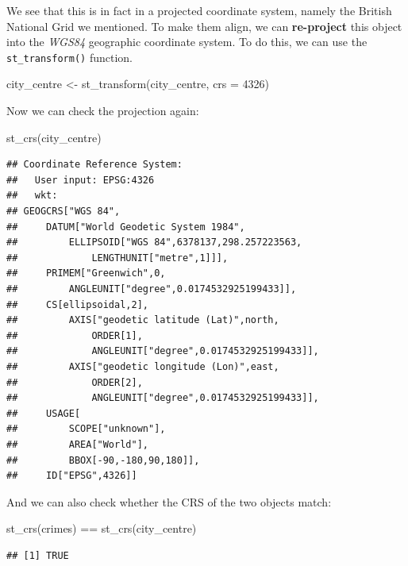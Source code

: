\documentclass[
]{book}
\newenvironment{Shaded}{\begin{snugshade}}{\end{snugshade}}
\newcommand{\AttributeTok}[1]{\textcolor[rgb]{0.77,0.63,0.00}{#1}}
\newcommand{\DecValTok}[1]{\textcolor[rgb]{0.00,0.00,0.81}{#1}}
\newcommand{\FunctionTok}[1]{\textcolor[rgb]{0.00,0.00,0.00}{#1}}
\newcommand{\NormalTok}[1]{#1}
\newcommand{\OtherTok}[1]{\textcolor[rgb]{0.56,0.35,0.01}{#1}}
\newcommand{\SpecialCharTok}[1]{\textcolor[rgb]{0.00,0.00,0.00}{#1}}
\begin{document}
We see that this is in fact in a projected coordinate system, namely the British National Grid we mentioned. To make them align, we can \textbf{re-project} this object into the \emph{WGS84} geographic coordinate system. To do this, we can use the \texttt{st\_transform()} function.

\begin{Shaded}
\begin{Highlighting}[]
\NormalTok{city\_centre }\OtherTok{\textless{}{-}} \FunctionTok{st\_transform}\NormalTok{(city\_centre, }\AttributeTok{crs =} \DecValTok{4326}\NormalTok{)}
\end{Highlighting}
\end{Shaded}

Now we can check the projection again:

\begin{Shaded}
\begin{Highlighting}[]
\FunctionTok{st\_crs}\NormalTok{(city\_centre)}
\end{Highlighting}
\end{Shaded}

\begin{verbatim}
## Coordinate Reference System:
##   User input: EPSG:4326 
##   wkt:
## GEOGCRS["WGS 84",
##     DATUM["World Geodetic System 1984",
##         ELLIPSOID["WGS 84",6378137,298.257223563,
##             LENGTHUNIT["metre",1]]],
##     PRIMEM["Greenwich",0,
##         ANGLEUNIT["degree",0.0174532925199433]],
##     CS[ellipsoidal,2],
##         AXIS["geodetic latitude (Lat)",north,
##             ORDER[1],
##             ANGLEUNIT["degree",0.0174532925199433]],
##         AXIS["geodetic longitude (Lon)",east,
##             ORDER[2],
##             ANGLEUNIT["degree",0.0174532925199433]],
##     USAGE[
##         SCOPE["unknown"],
##         AREA["World"],
##         BBOX[-90,-180,90,180]],
##     ID["EPSG",4326]]
\end{verbatim}

And we can also check whether the CRS of the two objects match:

\begin{Shaded}
\begin{Highlighting}[]
\FunctionTok{st\_crs}\NormalTok{(crimes) }\SpecialCharTok{==} \FunctionTok{st\_crs}\NormalTok{(city\_centre)}
\end{Highlighting}
\end{Shaded}

\begin{verbatim}
## [1] TRUE
\end{verbatim}
\end{document}
